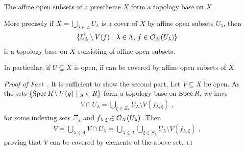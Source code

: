 \documentclass[a4paper,parskip=half,numbers=enddot, DIV=12]{scrreprt}
\begin{document}
\begin{fact}
	\begin{alphanumerate}
		\item {} The affine open subsets of a prescheme $X$ form a topology base on $X$.
		\item More precisely if $X=\bigcup_{\lambda\in \Lambda} U_\lambda$ is a cover of $X$ by affine open subsets $U_\lambda$, then 
		\begin{align*}
		\left\{U_\lambda\setminus V(f)\ \middle|\  \lambda\in \Lambda\text{, }f\in \mathcal{O}_X(U_\lambda)\right\}
		\end{align*}
		is a topology base on $X$ consisting of affine open subsets.
	\end{alphanumerate}
\end{fact}
\begin{rem*}
    In particular, if $U\subseteq X$ is open, if can be covered by affine open subsets of $X$. 
\end{rem*}
\begin{proof}[Proof of Fact~]
    It is sufficient to show the second part. Let $V\subseteq X$ be open. As the sets $\left\{\operatorname{Spec} R\setminus V(g)\ \middle|\  g\in R\right\}$ form a topology base on $\operatorname{Spec} R$, we have
    \begin{align*}
    	V\cap U_\lambda = \bigcup_{\xi\in\Xi_\lambda} U_\lambda \setminus V(f_{\lambda,\xi})\;, 
    \end{align*}
    for some indexing sets $\Xi_\lambda$ and $f_{\lambda,\xi}\in \mathcal{O}_X(U_\lambda)$. Then 
    \begin{align*}
    	V= \bigcup_{\lambda\in\Lambda} V\cap U_\lambda= \bigcup_{\lambda\in \Lambda} \bigcup_{\xi\in\Xi_\lambda} U_\lambda\setminus V(f_{\lambda,\xi})\;,
    \end{align*}
    proving that $V$ can be covered by elements of the above set.
\end{proof}
\end{document}
